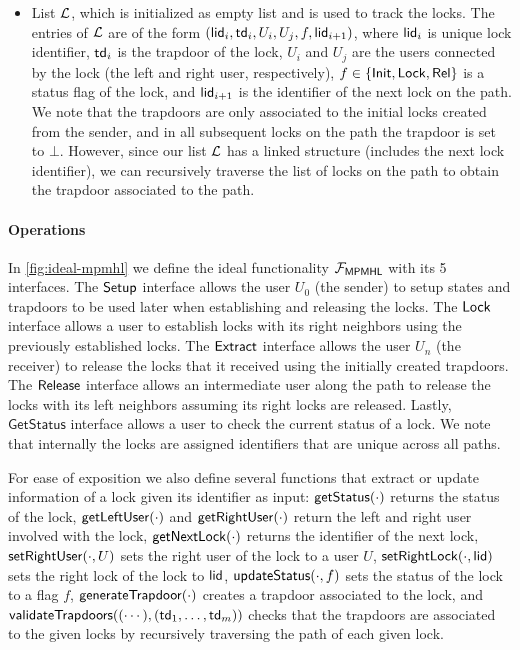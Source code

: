 \begin{itemize}
	\item List $\mathcal{L}$, which is initialized as empty list and is used to track the locks. 
	The entries of $\mathcal{L}$ are of the form $(\mathsf{lid}_i, \mathsf{td}_i, U_i, U_j, f, \\ \mathsf{lid}_{i+1})$, 
	where $\mathsf{lid}_i$ is unique lock identifier, $\mathsf{td}_i$ is the trapdoor of the lock, $U_i$ 
	and $U_j$ are the users connected by the lock (the left and right user, respectively), 
	$f \in \{\mathsf{Init},\mathsf{Lock},\mathsf{Rel}\}$ is a status flag of the lock, and $\mathsf{lid}_{i+1}$ is the 
	identifier of the next lock on the path. We note that the trapdoors are only associated 
	to the initial locks created from the sender, and in all subsequent locks on the path the 
	trapdoor is set to $\bot$. However, since our list $\mathcal{L}$ has a linked structure (includes 
	the next lock identifier), we can recursively traverse the list of locks on the path to 
	obtain the trapdoor associated to the path.
\end{itemize}

\paragraph{Operations}
In \cref{fig:ideal-mpmhl} we define the ideal functionality $\mathcal{F}_{\mathsf{MPMHL}}$ with its 5 
interfaces. The $\mathsf{Setup}$ interface allows the user $U_0$ (the sender) to setup states and 
trapdoors to be used later when establishing and releasing the locks. The $\mathsf{Lock}$ interface 
allows a user to establish locks with its right neighbors using the previously established 
locks. The $\mathsf{Extract}$ interface allows the user $U_n$ (the receiver) to release the locks that it 
received using the initially created trapdoors. The $\mathsf{Release}$ interface allows an intermediate 
user along the path to release the locks with its left neighbors assuming its right locks are 
released. Lastly, $\mathsf{GetStatus}$ interface allows a user to check the current status of 
a lock. We note that internally the locks are assigned identifiers that are unique across all 
paths.

For ease of exposition we also define several functions that extract or update information of 
a lock given its identifier as input: $\mathsf{getStatus}(\cdot)$ returns the status of the lock, 
$\mathsf{getLeftUser}(\cdot)$ and $\mathsf{getRightUser}(\cdot)$ return the left and right user involved with the 
lock, $\mathsf{getNextLock}(\cdot)$ returns the identifier of the next lock, $\mathsf{setRightUser}(\cdot, U)$ 
sets the right user of the lock to a user $U$, $\mathsf{setRightLock}(\cdot, \mathsf{lid})$ sets the right lock 
of the lock to $\mathsf{lid}$, $\mathsf{updateStatus}(\cdot, f)$ sets the status of the lock to a flag $f$, 
$\mathsf{generateTrapdoor}(\cdot)$ creates a trapdoor associated to the lock, and $\mathsf{validateTrapdoors}
((\cdots), (\mathsf{td}_1,\ldots,\mathsf{td}_m))$ checks that the trapdoors are associated to the given locks 
by recursively traversing the path of each given lock.

